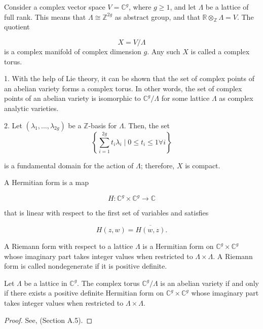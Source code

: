 \begin{definition}
    Consider a complex vector space $V=\mathbb{C}^{g}$, where $g \geq 1$, and let $\Lambda$ be a lattice of full rank. This means that $\Lambda \cong \mathbb{Z}^{2 g}$ as abstract group, and that $\mathbb{R} \otimes_{\mathbb{Z}} \Lambda=V$. The quotient

$$
X=V / \Lambda
$$
is a complex manifold of complex dimension $g$. Any such $X$ is called a complex torus. 

\end{definition}
\begin{remark}
1. With the help of Lie theory, it can be shown that the set of complex points of an abelian variety forms a complex torus. In other words, the set of  complex points of an abelian variety is isomorphic to $\mathbb{C}^{g} / \Lambda$ for some lattice $\Lambda$ as complex analytic varieties.

2. Let $\left(\lambda_{1}, \ldots, \lambda_{2 g}\right)$ be a $\mathbb{Z}$-basis for $\Lambda$. Then, the set $$
\left\{\sum_{i=1}^{2 g} t_{i} \lambda_{i} \mid 0 \leq t_{i} \leq 1 \forall i\right\}
$$

is a fundamental domain for the action of $\Lambda$; therefore, $X$ is compact.

\begin{definition}
    A Hermitian form is a map

$$
H: \mathbb{C}^{g} \times \mathbb{C}^{g} \rightarrow \mathbb{C}
$$

that is linear with respect to the first set of variables and satisfies

$$
H(z, w)=\overline{H(w, z)} .
$$

\end{definition}

\begin{definition}
    A Riemann form with respect to a lattice $\Lambda$ is a Hermitian form on $\mathbb{C}^{g} \times \mathbb{C}^{g}$ whose imaginary part takes integer values when restricted to $\Lambda \times \Lambda$. A Riemann form is called nondegenerate if it is positive definite.

\end{definition}

    \begin{theorem}\label{5.1.5}
        Let $\Lambda$ be a lattice in $\mathbb{C}^{g}$. The complex torus $\mathbb{C}^{g} / \Lambda$ is an abelian variety if and only if there exists a positive definite Hermitian form on $\mathbb{C}^{g} \times \mathbb{C}^{g}$ whose imaginary part takes integer values when restricted to $\Lambda \times \Lambda$.
\begin{proof}
    See, \cite{hindry-silverman-diophantine}(Section A.5).
\end{proof}
    

\end{theorem}
\end{remark}
